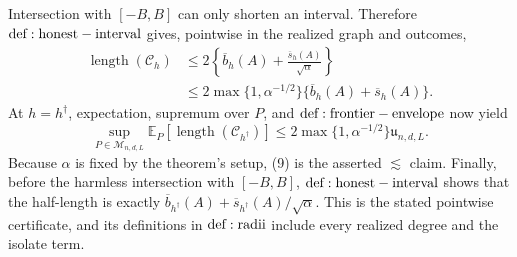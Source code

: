Intersection with \([-B,B]\) can only shorten an interval.  Therefore \({\rm def:honest-interval}\) gives, pointwise in the realized graph and outcomes,
\[
\begin{aligned}
 \operatorname{length}(\mathcal C_h)
 &\leq2\left\{\overline b_h(A)+
          \frac{\overline s_h(A)}{\sqrt\alpha}\right\}\\
 &\leq2\max\{1,\alpha^{-1/2}\}
       \{\overline b_h(A)+\overline s_h(A)\}.
\end{aligned}
\tag{8}
\]
At \(h=h^\dagger\), expectation, supremum over \(P\), and \({\rm def:frontier-envelope}\) now yield
\[
 \sup_{P\in\mathcal M_{n,d,L}}
 \mathbb E_P[\operatorname{length}(\mathcal C_{h^\dagger})]
 \leq2\max\{1,\alpha^{-1/2}\}\mathfrak u_{n,d,L}.
\tag{9}
\]
Because \(\alpha\) is fixed by the theorem's setup, (9) is the asserted \(\lesssim\) claim.  Finally, before the harmless intersection with \([-B,B]\), \({\rm def:honest-interval}\) shows that the half-length is exactly
\(\overline b_{h^\dagger}(A)+\overline s_{h^\dagger}(A)/\sqrt\alpha\).  This is the stated pointwise certificate, and its definitions in \({\rm def:radii}\) include every realized degree and the isolate term.